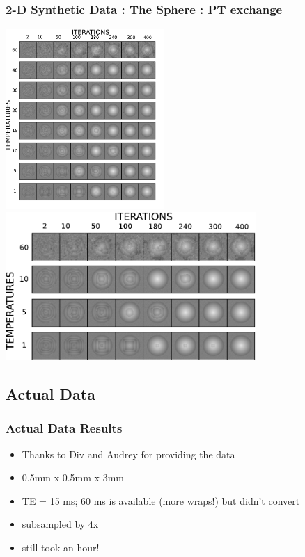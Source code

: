 \documentclass[compress]{beamer}
\begin{document}
\begin{frame}
  \frametitle{2-D Synthetic Data : The Sphere : PT exchange}
   {
    \includegraphics[width=6cm]{sphere_replica}
  }
   {
    \includegraphics[width=9.5cm]{sphere_replica_zoom}
  }
\end{frame}

\subsection{Actual Data}
\begin{frame}
  \frametitle{Actual Data Results} 
  \begin{itemize}
  \item Thanks to Div and Audrey for providing the data
  \item 0.5mm x 0.5mm x 3mm
  \item TE = 15 ms; 60 ms is available (more wraps!) but didn't convert
  \item subsampled by 4x
  \item still took an hour! 
  \end{itemize}
\end{frame}
\end{document}
